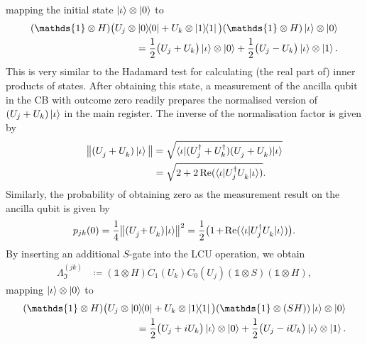 \documentclass[10pt,conference]{IEEEtran}
\newcommand*{\one}{\mathds{1}}        %
\begin{document}
mapping the initial state $\ket{\iota} \otimes \ket{0}$ to
\begin{align*}
    (\one \otimes H) \big(U_{j} \otimes \ketbra{0}{0} + U_{k} \otimes \ketbra{1}{1}\big) (\one \otimes H) \ket{\iota} \otimes \ket{0} \\
    = \frac{1}{2} \big(U_{j} + U_{k}\big) \ket{\iota} \otimes \ket{0} + \frac{1}{2} \big(U_{j} - U_{k}\big) \ket{\iota} \otimes \ket{1}.
\end{align*}
This is very similar to the Hadamard test for calculating (the real part of) inner products of states.
After obtaining this state, a measurement of the ancilla qubit in the CB with outcome zero readily prepares the normalised version of $(U_{j} + U_{k}) \ket{\iota}$ in the main register.
The inverse of the normalisation factor is given by
\begin{align}\label{equation:NormalisationReal}
    \begin{split}
        \big\lVert(U_{j}^{\vphantom{\dagger}} + U_{k}^{\vphantom{\dagger}}) \ket{\iota}\big\rVert &= \sqrt{\braket{\iota | (U_{j}^{\dagger} + U_{k}^{\dagger}) (U_{j}^{\vphantom{\dagger}} + U_{k}^{\vphantom{\dagger}}) | \iota}} \\
        &= \sqrt{2 + 2 \Re(\braket{\iota | U_{j}^{\dagger} U_{k}^{\vphantom{\dagger}} | \iota})}.
    \end{split}
\end{align}
Similarly, the probability of obtaining zero as the measurement result on the ancilla qubit is given by
\begin{align}\label{equation:ProbabilityReal}
    p_{j k}(0) = \frac{1}{4} \big\lVert(U_{j}^{\vphantom{\dagger}}\hspace*{-2pt} +\hspace*{-1pt} U_{k}^{\vphantom{\dagger}})\hspace*{-1pt} \ket{\iota}\hspace*{-2pt}\big\rVert^{2} = \frac{1}{2} \big(1\hspace*{-1pt} +\hspace*{-1pt} \Re(\braket{\iota | U_{j}^{\dagger} U_{k}^{\vphantom{\dagger}} | \iota})\big).
\end{align}
By inserting an additional $S$-gate into the LCU operation, we obtain
\begin{align*}
    \Lambda_{\Im}^{(j k)} &\coloneqq (\one \otimes H) C_{1}(U_{k}) C_{0}(U_{j}) (\one \otimes S) (\one \otimes H),
\end{align*}
mapping $\ket{\iota} \otimes \ket{0}$ to
\begin{align*}
    (\one \otimes H) \big(U_{j} \otimes \ketbra{0}{0} + U_{k} \otimes \ketbra{1}{1}\big) (\one \otimes (S H)) \ket{\iota} \otimes \ket{0} \\
    = \frac{1}{2} \big(U_{j} + i U_{k}\big) \ket{\iota} \otimes \ket{0} + \frac{1}{2} \big(U_{j} - i U_{k}\big) \ket{\iota} \otimes \ket{1}.
\end{align*}
\end{document}
